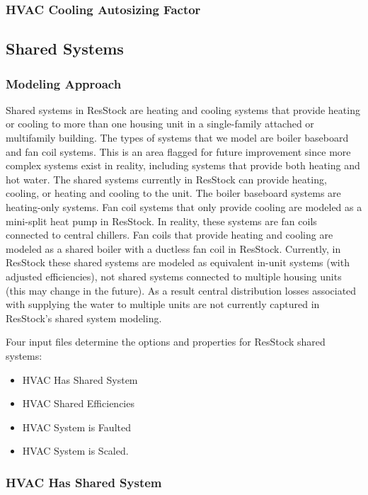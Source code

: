 \subsubsection{HVAC Cooling Autosizing Factor}


\subsection{Shared Systems} \label{sec:shared_systems}
\subsubsection{Modeling Approach}
Shared systems in ResStock are heating and cooling systems that provide heating or cooling to more than one housing unit in a single-family attached or multifamily building. The types of systems that we model are boiler baseboard and fan coil systems. This is an area flagged for future improvement since more complex systems exist in reality, including systems that provide both heating and hot water. The shared systems currently in ResStock can provide heating, cooling, or heating and cooling to the unit. The boiler baseboard systems are heating-only systems. Fan coil systems that only provide cooling are modeled as a mini-split heat pump in ResStock. In reality, these systems are fan coils connected to central chillers. Fan coils that provide heating and cooling are modeled as a shared boiler with a ductless fan coil in ResStock. Currently, in ResStock these shared systems are modeled as equivalent in-unit systems (with adjusted efficiencies), not shared systems connected to multiple housing units (this may change in the future). As a result central distribution losses associated with supplying the water to multiple units are not currently captured in ResStock's shared system modeling.

Four input files determine the options and properties for ResStock shared systems:
\begin{itemize}
    \item HVAC Has Shared System
    \item HVAC Shared Efficiencies
    \item HVAC System is Faulted
    \item HVAC System is Scaled.
\end{itemize}

\subsubsection{HVAC Has Shared System}


